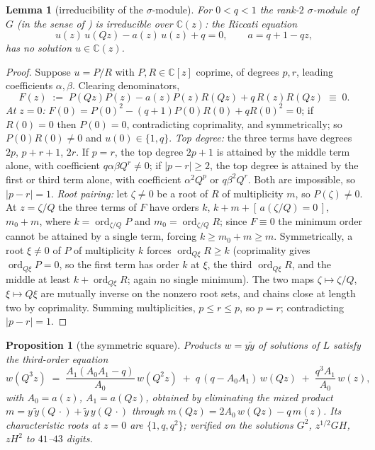 \documentclass[11pt]{article}
\theoremstyle{plain}
\newtheorem{lemma}[theorem]{Lemma}
\newtheorem{proposition}[theorem]{Proposition}
\theoremstyle{definition}
\theoremstyle{remark}
\newcommand{\C}{\mathbb{C}}
\begin{document}
\begin{lemma}[irreducibility of the $\sigma$-module]
\label{lem:irreducible}
For $0<q<1$ the rank-$2$ $\sigma$-module of $G$ (in the sense of \cite{PutSinger1997}) is
irreducible over $\C(z)$: the Riccati equation
\[
   u(z)\,u(Qz)-a(z)\,u(z)+q=0,\qquad a=q+1-qz,
\]
has no solution $u\in\C(z)$.
\end{lemma}

\begin{proof}
Suppose $u=P/R$ with $P,R\in\C[z]$ coprime, of degrees $p,r$, leading coefficients $\alpha,\beta$.
Clearing denominators,
\[
   F(z)\;:=\;P(Qz)P(z)-a(z)P(z)R(Qz)+q\,R(z)R(Qz)\;\equiv\;0 .
\]
\emph{At $z=0$:} $F(0)=P(0)^2-(q+1)P(0)R(0)+qR(0)^2=0$; if $R(0)=0$ then $P(0)=0$, contradicting
coprimality, and symmetrically; so $P(0)R(0)\ne0$ and $u(0)\in\{1,q\}$.
\emph{Top degree:} the three terms have degrees $2p$, $p+r+1$, $2r$. If $p=r$, the top degree
$2p+1$ is attained by the middle term alone, with coefficient $q\alpha\beta Q^{r}\ne0$;
if $|p-r|\ge2$, the top degree is attained by the first or third term alone, with coefficient
$\alpha^2Q^{p}$ or $q\beta^2Q^{r}$. Both are impossible, so $|p-r|=1$.
\emph{Root pairing:} let $\zeta\ne0$ be a root of $R$ of multiplicity $m$, so $P(\zeta)\ne0$. At
$z=\zeta/Q$ the three terms of $F$ have orders $k$, $k+m+[\,a(\zeta/Q)=0\,]$, $m_0+m$, where
$k=\operatorname{ord}_{\zeta/Q}P$ and $m_0=\operatorname{ord}_{\zeta/Q}R$; since $F\equiv0$ the
minimum order cannot be attained by a single term, forcing $k\ge m_0+m\ge m$. Symmetrically, a root
$\xi\ne0$ of $P$ of multiplicity $k$ forces $\operatorname{ord}_{Q\xi}R\ge k$ (coprimality gives
$\operatorname{ord}_{Q\xi}P=0$, so the first term has order $k$ at $\xi$, the third
$\operatorname{ord}_{Q\xi}R$, and the middle at least $k+\operatorname{ord}_{Q\xi}R$; again no
single minimum). The two maps $\zeta\mapsto\zeta/Q$, $\xi\mapsto Q\xi$ are mutually inverse on the
nonzero root sets, and chains close at length two by coprimality. Summing multiplicities,
$p\le r\le p$, so $p=r$; contradicting $|p-r|=1$.
\end{proof}

\begin{proposition}[the symmetric square]
\label{prop:sym2}
Products $w=y\tilde y$ of solutions of $L$ satisfy the third-order equation
\[
   w(Q^3z)\;=\;\frac{A_1(A_0A_1-q)}{A_0}\,w(Q^2z)\;+\;q\,(q-A_0A_1)\,w(Qz)\;+\;\frac{q^3A_1}{A_0}\,w(z),
\]
with $A_0=a(z)$, $A_1=a(Qz)$, obtained by eliminating the mixed product
$m=y\,\tilde y(Q\,\cdot)+\tilde y\,y(Q\,\cdot)$ through $m(Qz)=2A_0\,w(Qz)-q\,m(z)$. Its
characteristic roots at $z=0$ are $\{1,q,q^2\}$; verified on the solutions $G^2$, $z^{1/2}GH$,
$zH^2$ to $41$--$43$ digits.
\end{proposition}
\end{document}
